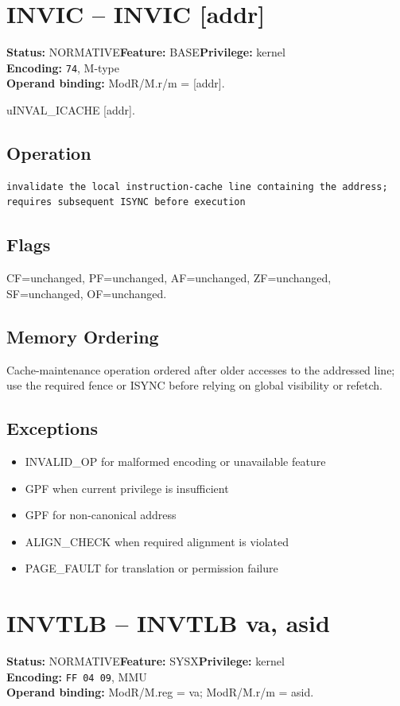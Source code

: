 \documentclass[10pt]{article}
\begin{document}
\section{INVIC -- INVIC [addr]}
\textbf{Status:} NORMATIVE\quad \textbf{Feature:} BASE\quad \textbf{Privilege:} kernel\\
\textbf{Encoding:} \texttt{74}, M-type\\
\textbf{Operand binding:} ModR/M.r/m = [addr].

uINVAL\_ICACHE [addr].

\subsection*{Operation}
\begin{lstlisting}
invalidate the local instruction-cache line containing the address; requires subsequent ISYNC before execution
\end{lstlisting}
\subsection*{Flags}
CF=unchanged, PF=unchanged, AF=unchanged, ZF=unchanged, SF=unchanged, OF=unchanged.
\subsection*{Memory Ordering}
Cache-maintenance operation ordered after older accesses to the addressed line; use the required fence or ISYNC before relying on global visibility or refetch.
\subsection*{Exceptions}
\begin{itemize}
\item INVALID\_OP for malformed encoding or unavailable feature
\item GPF when current privilege is insufficient
\item GPF for non-canonical address
\item ALIGN\_CHECK when required alignment is violated
\item PAGE\_FAULT for translation or permission failure
\end{itemize}
\clearpage

\section{INVTLB -- INVTLB va, asid}
\textbf{Status:} NORMATIVE\quad \textbf{Feature:} SYSX\quad \textbf{Privilege:} kernel\\
\textbf{Encoding:} \texttt{FF 04 09}, MMU\\
\textbf{Operand binding:} ModR/M.reg = va; ModR/M.r/m = asid.
\end{document}
